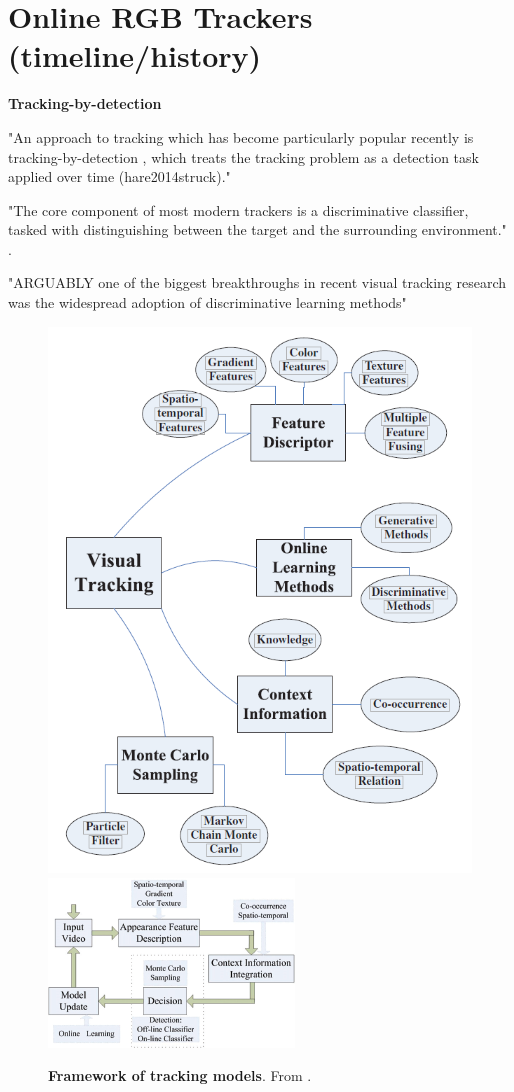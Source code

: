 \section{Online RGB Trackers (timeline/history)}

\textbf{Tracking-by-detection}

"An approach to tracking which has become particularly
popular recently is tracking-by-detection \cite{avidan2004support}, which treats
the tracking problem as a detection task applied over time (hare2014struck)."

"The core component of most modern trackers is a discriminative classifier, tasked with distinguishing between the target
and the surrounding environment." \cite{henriques2015tracking}.

"ARGUABLY one of the biggest breakthroughs in recent
visual tracking research was the widespread adoption
of discriminative learning methods" \cite{henriques2015tracking}

\begin{figure}
   \hspace{-2mm}
   \includegraphics[width=0.45\linewidth]{figures/yang2011recent_graph.png}
   \includegraphics[width=0.45\linewidth]{figures/yang2011recent_flowchart.png}
   \caption{\textbf{Framework of tracking models}. From \cite{avidan2004support}.}
   \label{fig:yang2011recent}
\end{figure}


